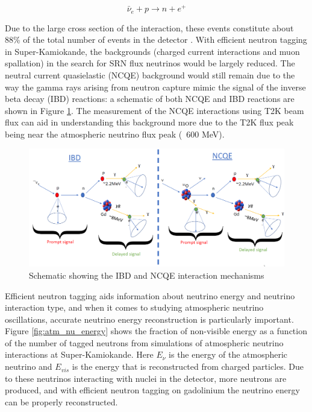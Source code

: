 \begin{equation}
    \bar{\nu}_{e}+p \rightarrow n+e^{+}
\label{eq:IBD_equation}
\end{equation}

Due to the large cross section of the interaction, these events constitute about 88\% of the total number of events in the detector \cite{martiEvaluationGadoliniumAction2020}. With efficient neutron tagging in Super-Kamiokande, the backgrounds (charged current interactions and muon spallation) in the search for SRN flux neutrinos would be largely reduced. The neutral current quasielastic (NCQE) background would still remain due to the way the gamma rays arising from neutron capture mimic the signal of the inverse beta decay (IBD) reactions: a schematic of both NCQE and IBD reactions are shown in Figure \ref{fig:NCQE_IBD}. The measurement of the NCQE interactions using T2K beam flux can aid in understanding this background more due to the T2K flux peak being near the atmospheric neutrino flux peak (~600 MeV). 


\begin{figure}[H]
    \includegraphics[width=\textwidth]{Figures/schematic.png}
\caption{Schematic showing the IBD and NCQE interaction mechanisms}
\label{fig:NCQE_IBD}
\end{figure}


Efficient neutron tagging aids information about neutrino energy and neutrino interaction type, and when it comes to studying atmospheric neutrino oscillations, accurate neutrino energy reconstruction is particularly important. Figure \ref{fig:atm_nu_energy} shows the fraction of non-visible energy as a function of the number of tagged neutrons from simulations of atmospheric neutrino interactions at Super-Kamiokande. Here $E_{\nu}$ is the energy of the atmospheric neutrino and $E_{vis}$ is the energy that is reconstructed from charged particles. Due to these neutrinos interacting with nuclei in the detector, more neutrons are produced, and with efficient neutron tagging on gadolinium the neutrino energy can be properly reconstructed. 

